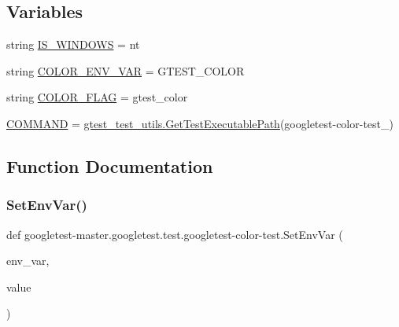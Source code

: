 \subsection*{Variables}
\begin{DoxyCompactItemize}
\item 
string \mbox{\hyperlink{namespacegoogletest-master_1_1googletest_1_1test_1_1googletest-color-test_a0e939442aec228b09266c46412c9898c}{I\+S\+\_\+\+W\+I\+N\+D\+O\+WS}} = \textquotesingle{}nt\textquotesingle{}
\item 
string \mbox{\hyperlink{namespacegoogletest-master_1_1googletest_1_1test_1_1googletest-color-test_aa9067274582395e388db99aca2ba99a9}{C\+O\+L\+O\+R\+\_\+\+E\+N\+V\+\_\+\+V\+AR}} = \textquotesingle{}G\+T\+E\+S\+T\+\_\+\+C\+O\+L\+OR\textquotesingle{}
\item 
string \mbox{\hyperlink{namespacegoogletest-master_1_1googletest_1_1test_1_1googletest-color-test_a0c255e8c6876e0b8d6115eb8d9ad6250}{C\+O\+L\+O\+R\+\_\+\+F\+L\+AG}} = \textquotesingle{}gtest\+\_\+color\textquotesingle{}
\item 
\mbox{\hyperlink{namespacegoogletest-master_1_1googletest_1_1test_1_1googletest-color-test_a64cde85fa1a956c6b233bcd0f1405882}{C\+O\+M\+M\+A\+ND}} = \mbox{\hyperlink{namespacegoogletest-master_1_1googletest_1_1test_1_1gtest__test__utils_a78bbc69ac699e750a6a29188caa643c4}{gtest\+\_\+test\+\_\+utils.\+Get\+Test\+Executable\+Path}}(\textquotesingle{}googletest-\/color-\/test\+\_\+\textquotesingle{})
\end{DoxyCompactItemize}


\subsection{Function Documentation}
\mbox{\label{namespacegoogletest-master_1_1googletest_1_1test_1_1googletest-color-test_a819cae823706e5a48aebd10a81fa11e8}} 
\subsubsection{\texorpdfstring{SetEnvVar()}{SetEnvVar()}}
{\footnotesize\ttfamily def googletest-\/master.\+googletest.\+test.\+googletest-\/color-\/test.\+Set\+Env\+Var (\begin{DoxyParamCaption}\item[{}]{env\+\_\+var,  }\item[{}]{value }\end{DoxyParamCaption})}

